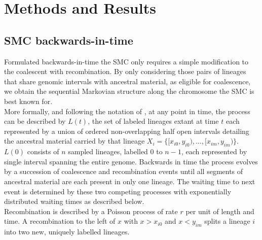\documentclass{article}
\begin{document}




\section{Methods and Results}
\subsection{SMC backwards-in-time}\label{par:description}

Formulated backwards-in-time the SMC \citep{mcvean_approximating_2005} only requires a simple modification to the 
coalescent with recombination. By only considering those pairs of 
lineages that share 
genomic intervals with ancestral material, as eligible for coalescence, we obtain the 
sequential Markovian structure along the chromosome the SMC is best known for.\\

More formally, and following the notation of \cite{mcvean_approximating_2005}, at any 
point in time, the process can be described by $L(t)$, the set of labeled lineages 
extant at time $t$ each represented by a union of ordered non-overlapping half open 
intervals detailing the ancestral material 
carried by that lineage $X_i = \{[x_{i0}, y_{i0}), \dotsc, [x_{im}, y_{im})\}$.
$L(0)$ consists of $n$ sampled lineages, labelled $0$ to $n-1$, each represented by 
single interval spanning the entire genome.
Backwards in time the process evolves by a succession of coalescence and recombination 
events until all segments of ancestral material are each present in only one lineage. 
The waiting time to next event is determined by these two competing processes with exponentially 
distributed waiting times as described below.\\

Recombination is described by a Poisson process of rate $r$ per unit of length and time. 
A recombination to the 
left of $x$ with $x>x_{i0}$ and $x<y_{im}$ splits a lineage $i$ into two new, uniquely 
labelled lineages.\\
\end{document}
